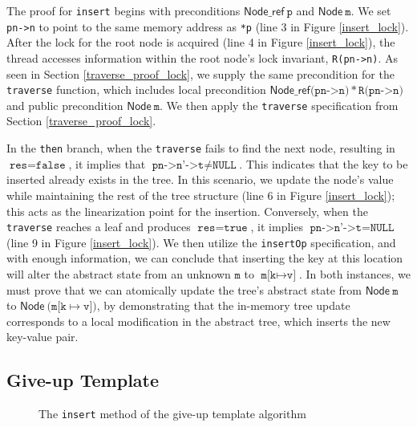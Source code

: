 \documentclass[a4paper,UKenglish,cleveref, autoref, thm-restate]{lipics-v2021}
\newcommand{\treerep}{\ensuremath{\mathsf{Node}}}
\newcommand{\nodeboxrep}{\ensuremath{\mathsf{Node\_ref}}}
\newcommand{\wm}[1]{\textbf{\textcolor{violet}{[Willam: #1]}}}
\begin{document}
The proof for \texttt{insert} begins with preconditions $\nodeboxrep \ \texttt{p}$ and $\treerep \ \texttt{m}$. We set \texttt{pn->n} to point to the same memory address as \texttt{*p} (line 3 in Figure \ref{insert_lock}). After the lock for the root node is acquired (line 4 in Figure \ref{insert_lock}), the thread accesses information within the root node's lock invariant, \texttt{R(pn->n)}. As seen in Section \ref{traverse_proof_lock}, we supply the same precondition for the \texttt{traverse} function, which includes local precondition $\nodeboxrep \texttt{(pn->n)} \ast \texttt{R(pn->n)}$ and public precondition $\treerep\ \texttt{m}$. We then apply the \texttt{traverse} specification from Section \ref{traverse_proof_lock}.

In the \texttt{then} branch, when the \texttt{traverse} fails to find the next node, resulting in $\texttt{res} = \texttt{false}$, it implies that $\texttt{pn->n'->t} \neq \texttt{NULL}$. This indicates that the key to be inserted already exists in the tree. In this scenario, we update the node's value while maintaining the rest of the tree structure (line 6 in Figure \ref{insert_lock}); this acts as the linearization point for the insertion. Conversely, when the \texttt{traverse} reaches a leaf and produces $\texttt{res} = \texttt{true}$, it implies $\texttt{pn->n'->t} = \texttt{NULL}$ (line 9 in Figure \ref{insert_lock}). We then utilize the \texttt{insertOp} specification, and with enough information, we can conclude that inserting the key at this location will alter the abstract state from an unknown $\texttt{m}$ to $\texttt{m[k} \mapsto \texttt{v]}$. In both instances, we must prove that we can atomically update the tree's abstract state from $\treerep \ \texttt{m}$ to $\treerep\ (\texttt{m[k} \mapsto \texttt{v])}$, by demonstrating that the in-memory tree update corresponds to a local modification in the abstract tree, which inserts the new key-value pair.


\subsection{Give-up Template}

\begin{figure}[ht]
	 
	\caption{The \lstinline{insert} method of the give-up template algorithm}
	\label{insert_giveup}
\end{figure}
\end{document}
